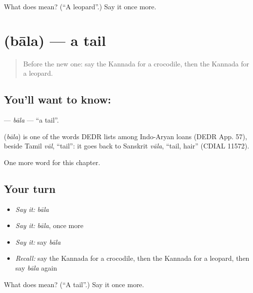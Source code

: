\begin{tcolorbox}[breakable,colback=teal!4,colframe=teal!35!black,title={Before you move on}]
What does  mean? (\textquotedblleft{}A leopard\textquotedblright{}.) Say it once more.
\end{tcolorbox}
\section[\texorpdfstring{\kn{ಬಾಲ} (bāla)}{ಬಾಲ (bāla)}]{ (bāla) — a tail}

\label{lesson:KA-C297-bala}



\begin{quote}
Before the new one: say the Kannada for a crocodile, then the Kannada for a leopard.
\end{quote}

\subsection*{You'll want to know: }
\textbf{} — \emph{bāla} — \textquotedblleft{}a tail\textquotedblright{}.

\begin{cousinweb}
\textbf{} (\emph{bāla}) is one of the words DEDR lists among Indo-Aryan loans (DEDR App. 57), beside Tamil \emph{vāl}, \textquotedblleft{}tail\textquotedblright{}: it goes back to Sanskrit \emph{vāla}, \textquotedblleft{}tail, hair\textquotedblright{} (CDIAL 11572).
\end{cousinweb}

\begin{grammarlens}[title={What you've built}]
One more word for this chapter.
\end{grammarlens}

\subsection*{Your turn}
\begin{itemize}
\raggedright
  \item \emph{Say it:} \emph{bāla}
  \item \emph{Say it:} \emph{bāla}, once more
  \item \emph{Say it:} say \emph{bāla}
  \item \emph{Recall:} say the Kannada for a crocodile, then the Kannada for a leopard, then say \emph{bāla} again
\end{itemize}

\begin{tcolorbox}[breakable,colback=teal!4,colframe=teal!35!black,title={Before you move on}]
What does  mean? (\textquotedblleft{}A tail\textquotedblright{}.) Say it once more.
\end{tcolorbox}
